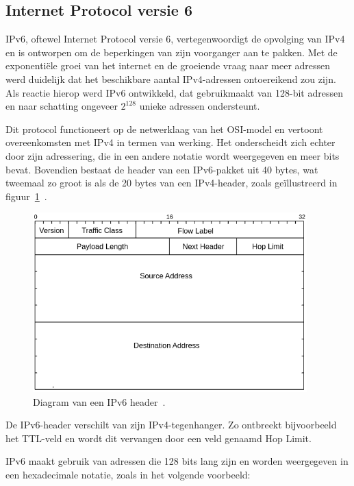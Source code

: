 \subsection{Internet Protocol versie 6}
\label{netwerk_ipv6}

IPv6, oftewel Internet Protocol versie 6, vertegenwoordigt de opvolging van IPv4 en is ontworpen om de beperkingen van zijn voorganger aan te pakken.
Met de exponenti\"ele groei van het internet en de groeiende vraag naar meer adressen werd duidelijk dat het beschikbare aantal IPv4-adressen ontoereikend zou zijn.
Als reactie hierop werd IPv6 ontwikkeld, dat gebruikmaakt van 128-bit adressen en naar schatting ongeveer \(2^{128}\) unieke adressen ondersteunt.

Dit protocol functioneert op de netwerklaag van het OSI-model en vertoont overeenkomsten met IPv4 in termen van werking.
Het onderscheidt zich echter door zijn adressering, die in een andere notatie wordt weergegeven en meer bits bevat.
Bovendien bestaat de header van een IPv6-pakket uit 40 bytes, wat tweemaal zo groot is als de 20 bytes van een IPv4-header, zoals geïllustreerd in figuur~\ref{fig:network-ipv6-header}~\autocite{dordal2020}.

\begin{figure}[h!]
    \begin{center}
        \includegraphics[width=300pt]
        {./graphics/network/ipv6-header.png}
        \caption{\label{fig:network-ipv6-header}Diagram van een IPv6 header~\autocite{dordal2020}.}
    \end{center}
\end{figure}

De IPv6-header verschilt van zijn IPv4-tegenhanger. Zo ontbreekt bijvoorbeeld het TTL-veld en wordt dit vervangen door een veld genaamd Hop Limit.

IPv6 maakt gebruik van adressen die 128 bits lang zijn en worden weergegeven in een hexadecimale notatie, zoals in het volgende voorbeeld:

